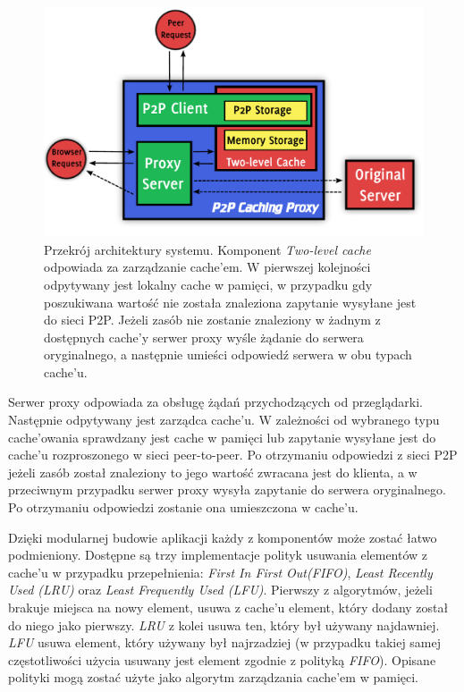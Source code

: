 \documentclass[a4paper,11pt]{scrartcl}
\newcommand{\s}{ }
\newcommand{\kesz}{cache}
\newcommand{\keszy}{cache'y}
\newcommand{\keszem}{cache'em}
\newcommand{\keszu}{cache'u}
\newcommand{\keszowania}{cache'owania}
\begin{document}
\begin{figure}[h!]
\centering
\includegraphics[width=0.9\linewidth]{img/architecture.pdf}
\caption{Przekrój architektury systemu. Komponent \textit{Two-level cache} odpowiada za zarządzanie \keszem. W pierwszej kolejności odpytywany jest lokalny \kesz\s w pamięci, w przypadku gdy poszukiwana wartość nie została znaleziona zapytanie wysyłane jest do sieci P2P. Jeżeli zasób nie zostanie znaleziony w żadnym z dostępnych \keszy\s serwer proxy wyśle żądanie do serwera oryginalnego, a następnie umieści odpowiedź serwera w obu typach \keszu.}
\label{fig_architecture}
\end{figure}

Serwer proxy odpowiada za obsługę żądań przychodzących od przeglądarki. Następnie odpytywany jest zarządca \keszu. W zależności od wybranego typu \keszowania\s sprawdzany jest \kesz\s w pamięci lub zapytanie wysyłane jest do \keszu\s rozproszonego w sieci peer-to-peer. Po otrzymaniu odpowiedzi z sieci P2P jeżeli zasób został znaleziony to jego wartość zwracana jest do klienta, a w przeciwnym przypadku serwer proxy wysyła zapytanie do serwera oryginalnego. Po otrzymaniu odpowiedzi zostanie ona umieszczona w \keszu.

Dzięki modularnej budowie aplikacji każdy z komponentów może zostać łatwo podmieniony. Dostępne są trzy implementacje polityk usuwania elementów z \keszu\s w przypadku przepełnienia: \textit{First In First Out(FIFO)}, \textit{Least Recently Used (LRU)} oraz \textit{Least Frequently Used (LFU)}. Pierwszy z algorytmów, jeżeli brakuje miejsca na nowy element, usuwa z \keszu\s element, który dodany został do niego jako pierwszy. \textit{LRU} z kolei usuwa ten, który był używany najdawniej. \textit{LFU} usuwa element, który używany był najrzadziej (w przypadku takiej samej częstotliwości użycia usuwany jest element zgodnie z polityką \textit{FIFO}). Opisane polityki mogą zostać użyte jako algorytm zarządzania \keszem\s w pamięci. 
\end{document}
